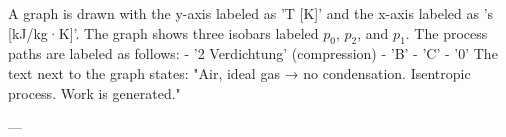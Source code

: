 A graph is drawn with the y-axis labeled as 'T [K]' and the x-axis labeled as 's [kJ/kg·K]'. The graph shows three isobars labeled \( p_0 \), \( p_2 \), and \( p_1 \). The process paths are labeled as follows:  
- '2 Verdichtung' (compression)  
- 'B'  
- 'C'  
- '0'  
The text next to the graph states:  
"Air, ideal gas → no condensation.  
Isentropic process.  
Work is generated."

---